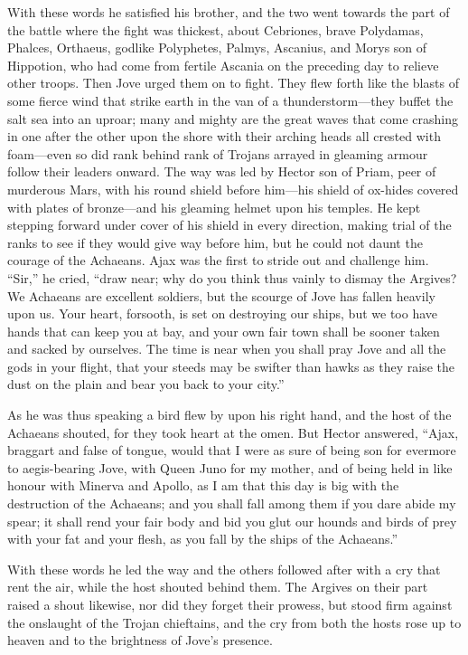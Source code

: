 With these words he satisfied his brother, and the two went towards the
part of the battle where the fight was thickest, about Cebriones, brave
Polydamas, Phalces, Orthaeus, godlike Polyphetes, Palmys, Ascanius, and
Morys son of Hippotion, who had come from fertile Ascania on the preceding
day to relieve other troops. Then Jove urged them on to fight. They flew
forth like the blasts of some fierce wind that strike earth in the van of
a thunderstorm—they buffet the salt sea into an uproar; many and
mighty are the great waves that come crashing in one after the other upon
the shore with their arching heads all crested with foam—even so did
rank behind rank of Trojans arrayed in gleaming armour follow their
leaders onward. The way was led by Hector son of Priam, peer of murderous
Mars, with his round shield before him—his shield of ox-hides
covered with plates of bronze—and his gleaming helmet upon his
temples. He kept stepping forward under cover of his shield in every
direction, making trial of the ranks to see if they would give way before
him, but he could not daunt the courage of the Achaeans. Ajax was the
first to stride out and challenge him. “Sir,” he cried, “draw near; why do
you think thus vainly to dismay the Argives? We Achaeans are excellent
soldiers, but the scourge of Jove has fallen heavily upon us. Your heart,
forsooth, is set on destroying our ships, but we too have hands that can
keep you at bay, and your own fair town shall be sooner taken and sacked
by ourselves. The time is near when you shall pray Jove and all the gods
in your flight, that your steeds may be swifter than hawks as they raise
the dust on the plain and bear you back to your city.”

As he was thus speaking a bird flew by upon his right hand, and the host
of the Achaeans shouted, for they took heart at the omen. But Hector
answered, “Ajax, braggart and false of tongue, would that I were as sure
of being son for evermore to aegis-bearing Jove, with Queen Juno for my
mother, and of being held in like honour with Minerva and Apollo, as I am
that this day is big with the destruction of the Achaeans; and you shall
fall among them if you dare abide my spear; it shall rend your fair body
and bid you glut our hounds and birds of prey with your fat and your
flesh, as you fall by the ships of the Achaeans.”

With these words he led the way and the others followed after with a cry
that rent the air, while the host shouted behind them. The Argives on
their part raised a shout likewise, nor did they forget their prowess, but
stood firm against the onslaught of the Trojan chieftains, and the cry
from both the hosts rose up to heaven and to the brightness of Jove’s
presence.

